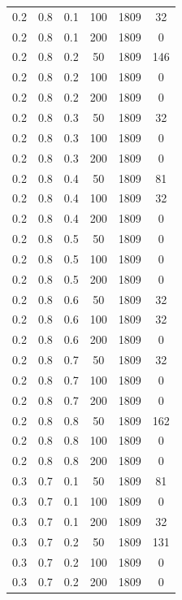\documentclass[a4paper,14pt, unknownkeysallowed]{extreport}
\begin{document}
\begin{center}
\begin{longtable}[c]{|c|c|c|c|c|c|}
		0.2 &  0.8 &  0.1 &  100 &  1809 &    32 \\
		0.2 &  0.8 &  0.1 &  200 &  1809 &     0 \\
	   \hline
		0.2 &  0.8 &  0.2 &   50 &  1809 &   146 \\
		0.2 &  0.8 &  0.2 &  100 &  1809 &     0 \\
		0.2 &  0.8 &  0.2 &  200 &  1809 &     0 \\
	   \hline
		0.2 &  0.8 &  0.3 &   50 &  1809 &    32 \\
		0.2 &  0.8 &  0.3 &  100 &  1809 &     0 \\
		0.2 &  0.8 &  0.3 &  200 &  1809 &     0 \\
	   \hline
		0.2 &  0.8 &  0.4 &   50 &  1809 &    81 \\
		0.2 &  0.8 &  0.4 &  100 &  1809 &    32 \\
		0.2 &  0.8 &  0.4 &  200 &  1809 &     0 \\
	   \hline
		0.2 &  0.8 &  0.5 &   50 &  1809 &     0 \\
		0.2 &  0.8 &  0.5 &  100 &  1809 &     0 \\
		0.2 &  0.8 &  0.5 &  200 &  1809 &     0 \\
	   \hline
		0.2 &  0.8 &  0.6 &   50 &  1809 &    32 \\
		0.2 &  0.8 &  0.6 &  100 &  1809 &    32 \\
		0.2 &  0.8 &  0.6 &  200 &  1809 &     0 \\
	   \hline
		0.2 &  0.8 &  0.7 &   50 &  1809 &    32 \\
		0.2 &  0.8 &  0.7 &  100 &  1809 &     0 \\
		0.2 &  0.8 &  0.7 &  200 &  1809 &     0 \\
	   \hline
		0.2 &  0.8 &  0.8 &   50 &  1809 &   162 \\
		0.2 &  0.8 &  0.8 &  100 &  1809 &     0 \\
		0.2 &  0.8 &  0.8 &  200 &  1809 &     0 \\
	   \hline
		0.3 &  0.7 &  0.1 &   50 &  1809 &    81 \\
		0.3 &  0.7 &  0.1 &  100 &  1809 &     0 \\
		0.3 &  0.7 &  0.1 &  200 &  1809 &    32 \\
	   \hline
		0.3 &  0.7 &  0.2 &   50 &  1809 &   131 \\
		0.3 &  0.7 &  0.2 &  100 &  1809 &     0 \\
		0.3 &  0.7 &  0.2 &  200 &  1809 &     0 \\
	   \hline

\end{longtable}
\end{center}
\end{document}
